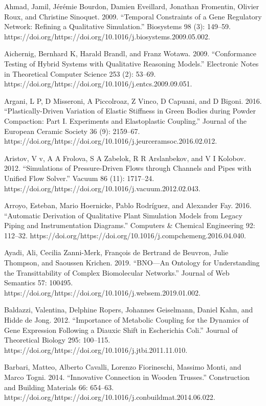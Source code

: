 \documentclass[utf8]{gradu3}
\begin{document}
Ahmad, Jamil, Jérémie Bourdon, Damien Eveillard, Jonathan Fromentin, Olivier Roux, 
and Christine Sinoquet. 2009. 
“Temporal Constraints of a Gene Regulatory Network: 
Refining a Qualitative Simulation.” Biosystems 98 (3): 149–59.
https://doi.org/https://doi.org/10.1016/j.biosystems.2009.05.002.

Aichernig, Bernhard K, Harald Brandl, and Franz Wotawa. 2009. “Conformance Testing of Hybrid Systems with Qualitative Reasoning Models.” Electronic Notes in Theoretical Computer Science 253 (2): 53–69. https://doi.org/https://doi.org/10.1016/j.entcs.2009.09.051.

Argani, L P, D Misseroni, A Piccolroaz, Z Vinco, D Capuani, and D Bigoni. 2016. “Plastically-Driven Variation of Elastic Stiffness in Green Bodies during Powder Compaction: Part I. Experiments and Elastoplastic Coupling.” Journal of the European Ceramic Society 36 (9): 2159–67. https://doi.org/https://doi.org/10.1016/j.jeurceramsoc.2016.02.012.

Aristov, V v, A A Frolova, S A Zabelok, R R Arslanbekov, and V I Kolobov. 2012. “Simulations of Pressure-Driven Flows through Channels and Pipes with Unified Flow Solver.” Vacuum 86 (11): 1717–24. https://doi.org/https://doi.org/10.1016/j.vacuum.2012.02.043.

Arroyo, Esteban, Mario Hoernicke, Pablo Rodríguez, and Alexander Fay. 2016. “Automatic Derivation of Qualitative Plant Simulation Models from Legacy Piping and Instrumentation Diagrams.” Computers \& Chemical Engineering 92: 112–32. https://doi.org/https://doi.org/10.1016/j.compchemeng.2016.04.040.

Ayadi, Ali, Cecilia Zanni-Merk, François de Bertrand de Beuvron, Julie Thompson, and Saoussen Krichen. 2019. “BNO—An Ontology for Understanding the Transittability of Complex Biomolecular Networks.” Journal of Web Semantics 57: 100495. https://doi.org/https://doi.org/10.1016/j.websem.2019.01.002.

Baldazzi, Valentina, Delphine Ropers, Johannes Geiselmann, Daniel Kahn, and Hidde de Jong. 2012. “Importance of Metabolic Coupling for the Dynamics of Gene Expression Following a Diauxic Shift in Escherichia Coli.” Journal of Theoretical Biology 295: 100–115. https://doi.org/https://doi.org/10.1016/j.jtbi.2011.11.010.

Barbari, Matteo, Alberto Cavalli, Lorenzo Fiorineschi, Massimo Monti, and Marco Togni. 2014. “Innovative Connection in Wooden Trusses.” Construction and Building Materials 66: 654–63. https://doi.org/https://doi.org/10.1016/j.conbuildmat.2014.06.022.
\end{document}
